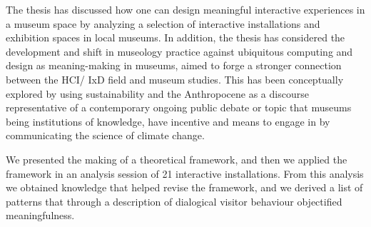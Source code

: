 
The thesis has discussed how one can design meaningful interactive experiences in a museum space by analyzing a selection of interactive installations and exhibition spaces in local museums. In addition, the thesis has considered the development and shift in museology practice against ubiquitous computing and design as meaning-making in museums, aimed to forge a stronger connection between the HCI/ IxD field and museum studies. This has been conceptually explored by using sustainability and the Anthropocene as a discourse representative of a contemporary ongoing public debate or topic that museums being institutions of knowledge, have incentive and means to engage in by communicating the science of climate change. 

We presented the making of a theoretical framework, and then we applied the framework in an analysis session of 21 interactive installations. From this analysis we obtained knowledge that helped revise the framework, and we derived a list of patterns that through a description of dialogical visitor behaviour objectified meaningfulness.
